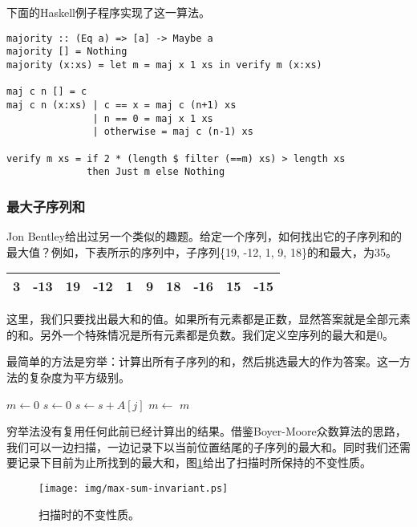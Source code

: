 \documentclass[UTF8]{article}
\begin{document}
下面的Haskell例子程序实现了这一算法。

\lstset{language=Haskell}
\begin{lstlisting}
majority :: (Eq a) => [a] -> Maybe a
majority [] = Nothing
majority (x:xs) = let m = maj x 1 xs in verify m (x:xs)

maj c n [] = c
maj c n (x:xs) | c == x = maj c (n+1) xs
               | n == 0 = maj x 1 xs
               | otherwise = maj c (n-1) xs

verify m xs = if 2 * (length $ filter (==m) xs) > length xs
              then Just m else Nothing
\end{lstlisting} %

\subsubsection{最大子序列和}

Jon Bentley给出过另一个类似的趣题\cite{programming-pearls}。给定一个序列，如何找出它的子序列和的最大值？例如，下表所示的序列中，子序列\{19, -12, 1, 9, 18\}的和最大，为35。

\begin{tabular}{|c|c|c|c|c|c|c|c|c|c|}
\hline
3 & -13 & 19 & -12 & 1 & 9 & 18 & -16 & 15 & -15 \\
\hline
\end{tabular}

这里，我们只要找出最大和的值。如果所有元素都是正数，显然答案就是全部元素的和。另外一个特殊情况是所有元素都是负数。我们定义空序列的最大和是0。

最简单的方法是穷举：计算出所有子序列的和，然后挑选最大的作为答案。这一方法的复杂度为平方级别。

\begin{algorithmic}[1]
  \State $m \gets 0$
    \State $s \gets 0$
      \State $s \gets s + A[j]$
      \State $m \gets $ 
    \EndFor
  \EndFor
  \State \Return $m$
\EndFunction
\end{algorithmic}

穷举法没有复用任何此前已经计算出的结果。借鉴Boyer-Moore众数算法的思路，我们可以一边扫描，一边记录下以当前位置结尾的子序列的最大和。同时我们还需要记录下目前为止所找到的最大和，图\ref{fig:max-sum-invariant}给出了扫描时所保持的不变性质。

\begin{figure}[htbp]
 \centering
 \texttt{[image: img/max-sum-invariant.ps]}
 \caption{扫描时的不变性质。}
 \label{fig:max-sum-invariant}
\end{figure}
\end{document}

